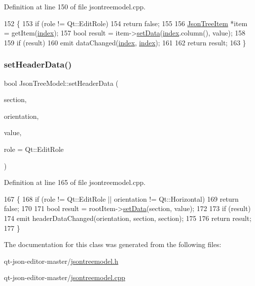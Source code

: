 Definition at line 150 of file jsontreemodel.\+cpp.


\begin{DoxyCode}
152 \{
153     \textcolor{keywordflow}{if} (role != Qt::EditRole)
154         \textcolor{keywordflow}{return} \textcolor{keyword}{false};
155 
156     \hyperlink{class_json_tree_item}{JsonTreeItem} *item = getItem(\hyperlink{class_json_tree_model_ac8be89cc178ef5151479be23006d18e3}{index});
157     \textcolor{keywordtype}{bool} result = item->\hyperlink{class_json_tree_item_a7b60096836271a128a142c023a769e12}{setData}(\hyperlink{class_json_tree_model_ac8be89cc178ef5151479be23006d18e3}{index}.column(), value);
158 
159     \textcolor{keywordflow}{if} (result)
160         emit dataChanged(\hyperlink{class_json_tree_model_ac8be89cc178ef5151479be23006d18e3}{index}, \hyperlink{class_json_tree_model_ac8be89cc178ef5151479be23006d18e3}{index});
161 
162     \textcolor{keywordflow}{return} result;
163 \}
\end{DoxyCode}
\mbox{\label{class_json_tree_model_aba2b3c92fedfff20fd926a3ff2c6b266}} 
\subsubsection{\texorpdfstring{set\+Header\+Data()}{setHeaderData()}}
{\footnotesize\ttfamily bool Json\+Tree\+Model\+::set\+Header\+Data (\begin{DoxyParamCaption}\item[{int}]{section,  }\item[{Qt\+::\+Orientation}]{orientation,  }\item[{const Q\+Variant \&}]{value,  }\item[{int}]{role = {\ttfamily Qt\+:\+:EditRole} }\end{DoxyParamCaption})}



Definition at line 165 of file jsontreemodel.\+cpp.


\begin{DoxyCode}
167 \{
168     \textcolor{keywordflow}{if} (role != Qt::EditRole || orientation != Qt::Horizontal)
169         \textcolor{keywordflow}{return} \textcolor{keyword}{false};
170 
171     \textcolor{keywordtype}{bool} result = rootItem->\hyperlink{class_json_tree_item_a7b60096836271a128a142c023a769e12}{setData}(section, value);
172 
173     \textcolor{keywordflow}{if} (result)
174         emit headerDataChanged(orientation, section, section);
175 
176     \textcolor{keywordflow}{return} result;
177 \}
\end{DoxyCode}


The documentation for this class was generated from the following files\+:\begin{DoxyCompactItemize}
\item 
qt-\/json-\/editor-\/master/\hyperlink{jsontreemodel_8h}{jsontreemodel.\+h}\item 
qt-\/json-\/editor-\/master/\hyperlink{jsontreemodel_8cpp}{jsontreemodel.\+cpp}\end{DoxyCompactItemize}
